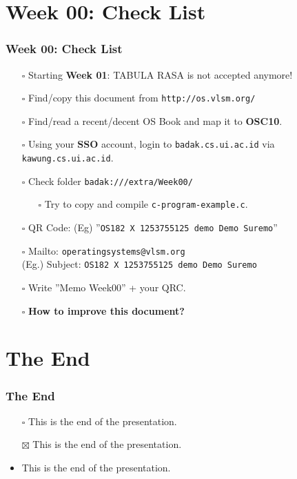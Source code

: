 \documentclass[xcolor=table, notheorems, hyperref={pdfpagelabels=false}]{beamer}
\begin{document}
\section{Week 00: Check List}
\begin{frame}
\frametitle{Week 00: Check List}
\begin{itemize}
\item[$\square$] Starting \textbf{Week 01}: TABULA RASA is not accepted anymore!
\item[$\square$] Find/copy this document from \texttt{http://os.vlsm.org/}
\item[$\square$] Find/read a recent/decent OS Book and map it to \textbf{OSC10}.
\item[$\square$] Using your \textbf{SSO} account, login to \texttt{badak.cs.ui.ac.id} via \texttt{kawung.cs.ui.ac.id}.
\item[$\square$] Check folder \texttt{badak:///extra/Week00/}
\begin{itemize}
\item[$\square$] Try to copy and compile \texttt{c-program-example.c}.
\end{itemize}
\item[$\square$] QR Code: (Eg) ''\texttt{OS182 X 1253755125 demo Demo Suremo}''
\item[$\square$] Mailto: \texttt{operatingsystems@vlsm.org} \\
                 (Eg.) Subject:  \texttt{OS182 X 1253755125 demo Demo Suremo}
\item[$\square$] Write ''Memo Week00'' + your QRC.
\item[$\square$] \textbf{How to improve this document?}
\end{itemize}
\end{frame}

\section{The End}
\begin{frame}
\frametitle{The End}
\begin{itemize}
\item[$\square$] This is the end of the presentation.
\item[$\boxtimes$] This is the end of the presentation.
\item This is the end of the presentation.
\end{itemize}
\end{frame}
\end{document}
